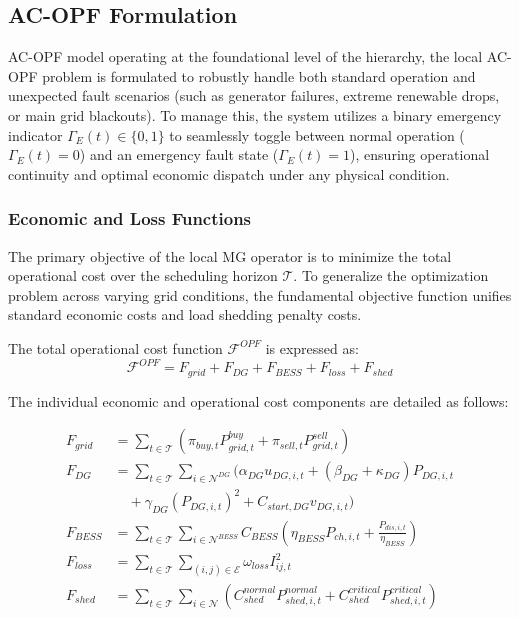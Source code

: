 \subsection{AC-OPF Formulation}
\label{subsec:ac_opf}

AC-OPF model operating at the foundational level of the hierarchy, the local AC-OPF problem is formulated to robustly handle both standard operation and unexpected fault scenarios (such as generator failures, extreme renewable drops, or main grid blackouts). To manage this, the system utilizes a binary emergency indicator $\Gamma_E(t) \in \{0, 1\}$ to seamlessly toggle between normal operation ($\Gamma_E(t) = 0$) and an emergency fault state ($\Gamma_E(t) = 1$), ensuring operational continuity and optimal economic dispatch under any physical condition.

\subsubsection{Economic and Loss Functions}
\label{subsubsec:economic_loss_functions}

The primary objective of the local MG operator is to minimize the total operational cost over the scheduling horizon $\mathcal{T}$. To generalize the optimization problem across varying grid conditions, the fundamental objective function unifies standard economic costs and load shedding penalty costs.

The total operational cost function $\mathcal{F}^{OPF}$ is expressed as:
\begin{equation}
    \mathcal{F}^{OPF} = F_{grid} + F_{DG} + F_{BESS} + F_{loss} + F_{shed}
    \label{eq:total_cost_function}
\end{equation}

The individual economic and operational cost components are detailed as follows:

\begin{subequations}
\label{eq:cost_components}
\begin{align}
    F_{grid} &= \sum_{t \in \mathcal{T}} \left( \pi_{buy,t} P_{grid,t}^{buy} + \pi_{sell,t} P_{grid,t}^{sell} \right) \label{eq:cost_grid} \\
    F_{DG} &= \sum_{t \in \mathcal{T}} \sum_{i \in \mathcal{N}^{DG}} \Big( \alpha_{DG} u_{DG,i,t} + (\beta_{DG} + \kappa_{DG}) P_{DG,i,t} \nonumber \\
    &\quad + \gamma_{DG} (P_{DG,i,t})^2 + C_{start,DG} v_{DG,i,t} \Big) \label{eq:cost_dg} \\
    F_{BESS} &= \sum_{t \in \mathcal{T}} \sum_{i \in \mathcal{N}^{BESS}} C_{BESS} \left( \eta_{BESS} P_{ch,i,t} + \frac{P_{dis,i,t}}{\eta_{BESS}} \right) \label{eq:cost_bess} \\
    F_{loss} &= \sum_{t \in \mathcal{T}} \sum_{(i,j) \in \mathcal{E}} \omega_{loss} I_{ij,t}^2 \label{eq:cost_loss} \\
    F_{shed} &= \sum_{t \in \mathcal{T}} \sum_{i \in \mathcal{N}} \left( C_{shed}^{normal} P_{shed,i,t}^{normal} + C_{shed}^{critical} P_{shed,i,t}^{critical} \right) \label{eq:cost_shed}
\end{align}
\end{subequations}

